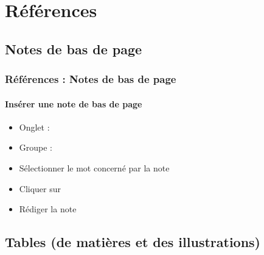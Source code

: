 \documentclass[xcolor=table]{beamer}
\begin{document}
\section{Références}

%

\subsection{Notes de bas de page}

\begin{frame}[t]
\frametitle{Références : Notes de bas de page}
\framesubtitle{Insérer une note de bas de page}

\begin{minipage}{0.69\textwidth}
\begin{itemize}
	\item Onglet : 
	\item Groupe : 
\end{itemize}
\end{minipage}
\begin{minipage}{0.30\textwidth}
\end{minipage}

\begin{itemize}
	\item Sélectionner le mot concerné par la note
	\item Cliquer sur 
	\item Rédiger la note
\end{itemize}

\end{frame}

\subsection{Tables (de matières et des illustrations)}
\end{document}
